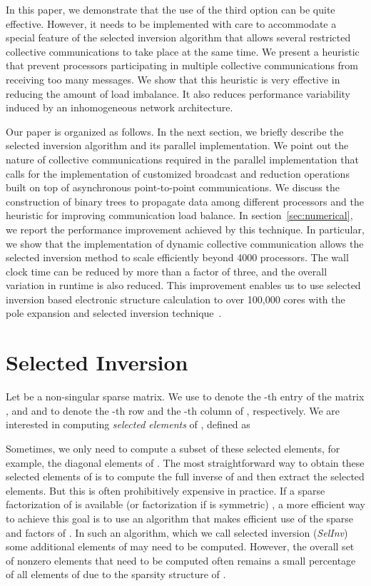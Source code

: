 \documentclass{acm_proc_article-sp}
\begin{document}
In this paper, we demonstrate that the use of the third option can be
quite effective.  However, it needs to be implemented with care
to accommodate a special feature of the selected inversion 
algorithm that allows several restricted collective communications 
to take place at the same time. We present a heuristic that prevent
processors participating in multiple collective communications
from receiving too many messages. We show that this heuristic is
very effective in reducing the amount of load imbalance. 
It also reduces performance variability induced by an inhomogeneous 
network architecture. 


Our paper is organized as follows. In the next section, we 
briefly describe the selected inversion algorithm and its
parallel implementation. We point out the nature of
collective communications required in the parallel implementation
that calls for the implementation of customized broadcast and
reduction operations built on top of asynchronous 
point-to-point communications. We discuss the construction of 
binary trees to propagate data among different processors and
the heuristic for improving communication load balance.
In section~\ref{sec:numerical}, we report the performance improvement
achieved by this technique.
In particular, we show that the implementation of dynamic collective
communication allows the selected inversion method
to scale efficiently beyond 4000 processors.  
The wall clock time can be reduced by more than a factor of three, and the
overall variation in runtime is also reduced.  This improvement
enables us to use selected inversion based electronic structure 
calculation to over 100,000 cores with the pole expansion and selected 
inversion technique~\cite{LinLuYingCarE2009,LinChenYangEtAl2013}.   



\section{Selected Inversion}\label{sec:prelim}

Let  be a non-singular sparse matrix.  
We use  to denote the -th entry of the matrix , 
and  and  to denote the -th row and the -th column
of , respectively.  We are interested in computing 
{\em selected elements} of , defined as

Sometimes, we only need to compute a subset of these selected elements,
for example, the diagonal elements of . The most
straightforward way to obtain these selected elements of  is to
compute the full inverse of  and then extract the selected elements.
But this is often prohibitively expensive in practice. 
If a sparse  factorization  of  is available
(or  factorization if  is symmetric) , a more efficient way 
to achieve this goal is to use an algorithm that makes efficient use 
of the sparse  and  factors of .  In such an algorithm, 
which we call selected inversion ({\em SelInv}) some 
additional elements of  may need to be computed. However, the overall 
set of nonzero elements that need to be computed often remains a small 
percentage of all elements of  due to the sparsity structure of .
\end{document}

